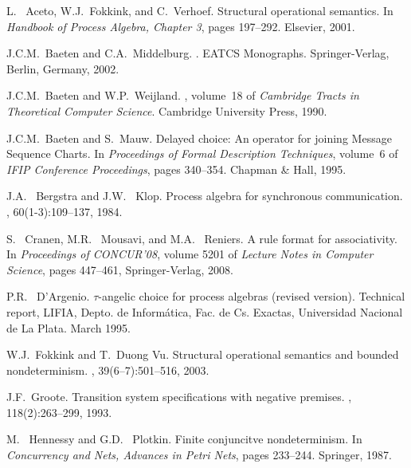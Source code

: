 \documentclass{llncs}
\begin{document}
%
\begin{thebibliography}{10}

L.~ Aceto, W.J.~Fokkink, and C.~Verhoef.
\newblock Structural operational semantics.
\newblock In {\em  Handbook of Process Algebra, {Chapter} 3}, pages 197--292. Elsevier, 2001.

J.C.M.~Baeten and C.A.~Middelburg.
.
\newblock EATCS Monographs. Springer-Verlag, Berlin, Germany, 2002.

J.C.M.~Baeten and W.P.~Weijland.
, volume~18 of {\em Cambridge Tracts in
  Theoretical Computer Science}.
\newblock Cambridge University Press, 1990.

J.C.M.~Baeten and S.~Mauw.
\newblock Delayed choice: An operator for joining {M}essage {S}equence
  {C}harts.
\newblock In {\em Proceedings of Formal Description Techniques}, volume~6 of {\em
  IFIP Conference Proceedings}, pages 340--354. Chapman {\&} Hall, 1995.

J.A.~ Bergstra and J.W.~ Klop.
\newblock Process algebra for synchronous communication.
, 60(1-3):109--137, 1984.

S.~ Cranen, M.R.~ Mousavi, and M.A.~ Reniers.
\newblock A rule format for associativity.
\newblock In {\em Proceedings  of CONCUR'08},
  volume 5201 of {\em Lecture Notes in Computer Science}, pages 447--461,
   Springer-Verlag, 2008.

P.R.~ D'Argenio.
\newblock $\tau$-angelic choice for process algebras (revised version).
\newblock Technical report, LIFIA, Depto. de Inform\'{a}tica, Fac. de Cs. Exactas, Universidad Nacional de La Plata. March 1995.

W.J.~Fokkink and T.~Duong Vu.
\newblock Structural operational semantics and bounded nondeterminism.
, 39(6--7):501--516, 2003.

J.F.~Groote.
\newblock Transition system specifications with negative premises.
, 118(2):263--299, 1993.

M.~ Hennessy and G.D.~ Plotkin.
\newblock Finite conjuncitve nondeterminism.
\newblock In {\em Concurrency and Nets, Advances in Petri Nets}, pages 233--244.
  Springer, 1987.


\end{thebibliography}
\end{document}
